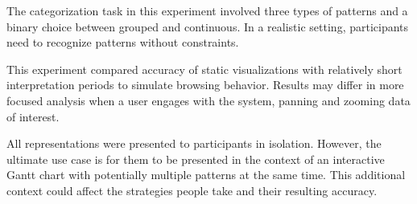 The categorization task in this experiment involved three types of patterns and a binary choice between grouped and continuous. In a realistic setting, participants need to recognize patterns without constraints.

This experiment compared accuracy of static visualizations with relatively short interpretation periods to simulate browsing behavior. Results may differ in more focused analysis when a user engages with the system, panning and zooming data of interest. 

All representations were presented to participants in isolation. However, the ultimate use case is for them to be presented in the context of an interactive Gantt chart with potentially multiple patterns at the same time. This additional context could affect the strategies people take and their resulting accuracy.